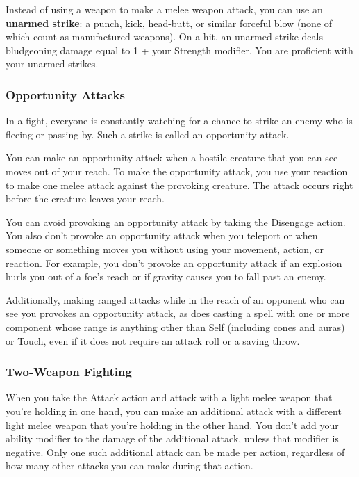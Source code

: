 Instead of using a weapon to make a melee weapon attack, you can use an \textbf{unarmed strike}: a punch, kick, head-butt, or similar forceful blow (none of which count as manufactured weapons). On a hit, an unarmed strike deals bludgeoning damage equal to 1 + your Strength modifier. You are proficient with your unarmed strikes.

\subsubsection{Opportunity Attacks}

In a fight, everyone is constantly watching for a chance to strike an enemy who is fleeing or passing by. Such a strike is called an opportunity attack.

You can make an opportunity attack when a hostile creature that you can see moves out of your reach. To make the opportunity attack, you use your reaction to make one melee attack against the provoking creature. The attack occurs right before the creature leaves your reach.

You can avoid provoking an opportunity attack by taking the Disengage action. You also don't provoke an opportunity attack when you teleport or when someone or something moves you without using your movement, action, or reaction. For example, you don't provoke an opportunity attack if an explosion hurls you out of a foe's reach or if gravity causes you to fall past an enemy.

Additionally, making ranged attacks while in the reach of an opponent who can see you provokes an opportunity attack, as does casting a spell with one or more component whose range is anything other than Self (including cones and auras) or Touch, even if it does not require an attack roll or a saving throw.

\subsubsection{Two-Weapon Fighting}

When you take the Attack action and attack with a light melee weapon that you're holding in one hand, you can make an additional attack with a different light melee weapon that you're holding in the other hand. You don't add your ability modifier to the damage of the additional attack, unless that modifier is negative. Only one such additional attack can be made per action, regardless of how many other attacks you can make during that action.

